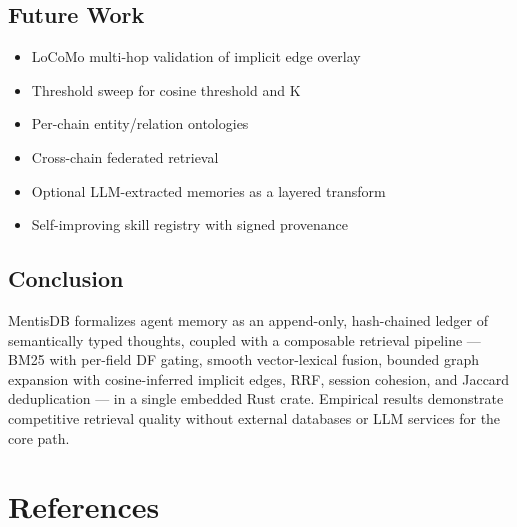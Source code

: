 \documentclass[11pt,a4paper]{article}
\begin{document}
\subsection{Future Work}

\begin{itemize}
  \item LoCoMo multi-hop validation of implicit edge overlay
  \item Threshold sweep for cosine threshold and K
  \item Per-chain entity/relation ontologies
  \item Cross-chain federated retrieval
  \item Optional LLM-extracted memories as a layered transform
  \item Self-improving skill registry with signed provenance
\end{itemize}

\subsection{Conclusion}

MentisDB formalizes agent memory as an append-only, hash-chained ledger of semantically
typed thoughts, coupled with a composable retrieval pipeline — BM25 with per-field DF
gating, smooth vector-lexical fusion, bounded graph expansion with cosine-inferred implicit
edges, RRF, session cohesion, and Jaccard deduplication — in a single embedded Rust crate.
Empirical results demonstrate competitive retrieval quality without external databases or
LLM services for the core path.

\section*{References}
\end{document}
